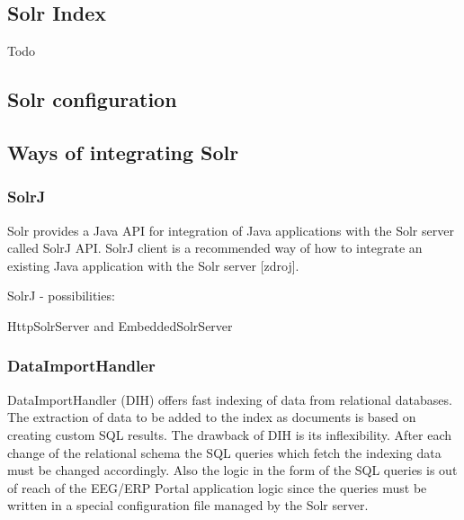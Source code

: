 \documentclass[12pt, oneside, a4paper]{book}
\begin{document}


\subsection{Solr Index}

Todo


\subsection{Solr configuration}


\subsection{Ways of integrating Solr}


\subsubsection{SolrJ}

Solr provides a Java API for integration of Java applications with the Solr server called SolrJ API.
SolrJ client is a recommended way of how to integrate an existing Java application with the Solr server [zdroj].

SolrJ - possibilities:


HttpSolrServer and EmbeddedSolrServer

\subsubsection{DataImportHandler}

DataImportHandler (DIH) offers fast indexing of data from relational databases. 
The extraction of data to be added to the index as documents is based on creating custom SQL results. 
The drawback of DIH is its inflexibility. 
After each change of the relational schema the SQL queries which fetch the indexing data must be changed accordingly. 
Also the logic in the form of the SQL queries is out of reach of the EEG/ERP Portal application logic since the queries must be written in a special configuration file managed by the Solr server.
\end{document}
